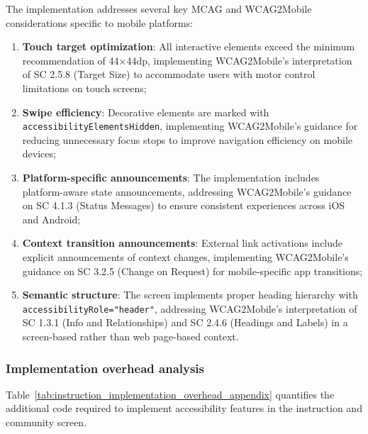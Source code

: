 The implementation addresses several key MCAG and WCAG2Mobile considerations specific to mobile platforms:

\begin{enumerate}
    \item \textbf{Touch target optimization}: All interactive elements exceed the minimum recommendation of 44×44dp, implementing WCAG2Mobile's interpretation of SC 2.5.8 (Target Size) to accommodate users with motor control limitations on touch screens;
    
    \item \textbf{Swipe efficiency}: Decorative elements are marked with \texttt{accessibilityElementsHidden}, implementing WCAG2Mobile's guidance for reducing unnecessary focus stops to improve navigation efficiency on mobile devices;
    
    \item \textbf{Platform-specific announcements}: The implementation includes platform-aware state announcements, addressing WCAG2Mobile's guidance on SC 4.1.3 (Status Messages) to ensure consistent experiences across iOS and Android;
    
    \item \textbf{Context transition announcements}: External link activations include explicit announcements of context changes, implementing WCAG2Mobile's guidance on SC 3.2.5 (Change on Request) for mobile-specific app transitions;
    
    \item \textbf{Semantic structure}: The screen implements proper heading hierarchy with \texttt{accessibilityRole="header"}, addressing WCAG2Mobile's interpretation of SC 1.3.1 (Info and Relationships) and SC 2.4.6 (Headings and Labels) in a screen-based rather than web page-based context.
\end{enumerate}

\subsubsection{Implementation overhead analysis}
\label{subsubsec:instruction-implementation-overhead}

Table~\ref{tab:instruction_implementation_overhead_appendix} quantifies the additional code required to implement accessibility features in the instruction and community screen.

